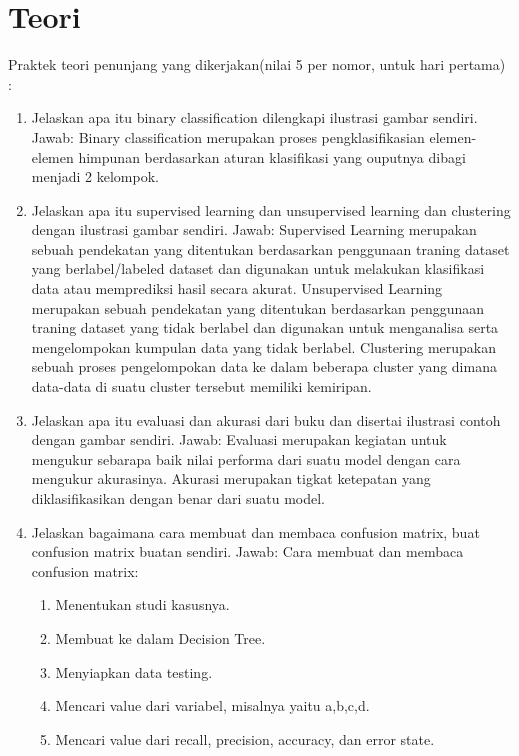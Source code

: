 \section{Teori}
Praktek teori penunjang yang dikerjakan(nilai 5 per nomor, untuk hari pertama) :
\begin{enumerate}
\item
Jelaskan apa itu binary classification dilengkapi ilustrasi gambar sendiri.
\newline Jawab:
\newline Binary classification merupakan proses pengklasifikasian elemen-elemen himpunan berdasarkan aturan klasifikasi yang ouputnya dibagi menjadi 2 kelompok.

\item
Jelaskan apa itu supervised learning dan unsupervised learning dan clustering dengan ilustrasi gambar sendiri.
\newline Jawab:
\newline Supervised Learning merupakan sebuah pendekatan yang ditentukan berdasarkan penggunaan
traning dataset yang berlabel/labeled dataset dan digunakan untuk melakukan klasifikasi data atau memprediksi hasil secara akurat.
\newline Unsupervised Learning merupakan sebuah pendekatan yang ditentukan berdasarkan penggunaan
traning dataset yang tidak berlabel dan digunakan untuk menganalisa serta mengelompokan kumpulan data yang tidak berlabel.
\newline Clustering merupakan sebuah proses pengelompokan data ke dalam beberapa cluster yang dimana data-data di suatu cluster tersebut memiliki kemiripan.

\item
Jelaskan apa itu evaluasi dan akurasi dari buku dan disertai ilustrasi contoh dengan gambar sendiri.
\newline Jawab:
\newline Evaluasi merupakan kegiatan untuk mengukur sebarapa baik nilai performa dari suatu
model dengan cara mengukur akurasinya. 
\newline Akurasi merupakan tigkat ketepatan yang diklasifikasikan dengan benar dari suatu model.

\item
Jelaskan bagaimana cara membuat dan membaca confusion matrix, buat confusion matrix buatan sendiri.
\newline Jawab:
\newline Cara membuat dan membaca confusion matrix:
\begin{enumerate}
	\item Menentukan studi kasusnya.
	\item Membuat ke dalam Decision Tree.
	\item Menyiapkan data testing.
	\item Mencari value dari variabel, misalnya yaitu a,b,c,d.
	\item Mencari value dari recall, precision, accuracy, dan error state.
\end{enumerate}


\end{enumerate}
